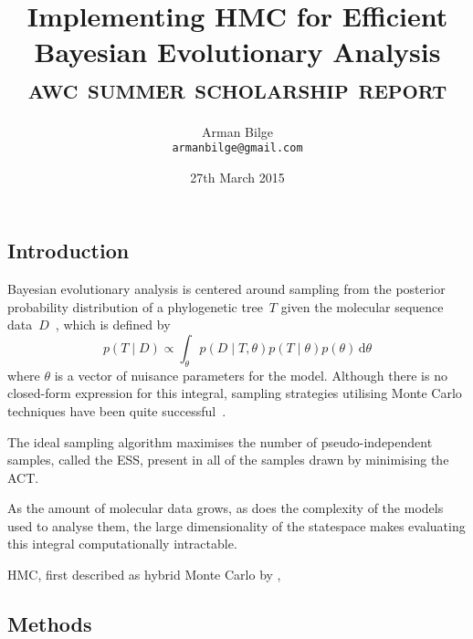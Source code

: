 \documentclass{article}
\title{Implementing \acl{HMC} for Efficient Bayesian Evolutionary Analysis \\
           \Large\textsc{awc summer scholarship report}}
\author{Arman Bilge \\ \texttt{armanbilge@gmail.com}}
\date{27th March 2015}
\newcommand{\dd}{\, \mathrm{d}}
\begin{document}
    \maketitle

    \subsection*{Introduction}

    Bayesian evolutionary analysis is centered around sampling from the
        posterior probability distribution of a phylogenetic tree~$T$ given the
        molecular sequence
        data~$D$~\cite{Bou+14}, which is defined by
        \begin{equation}
            p\left(T \mid D\right)
                \propto \int_\theta p\left(D \mid T,\theta\right)
                p\left(T \mid \theta\right) p\left(\theta\right) \dd\theta
        \end{equation}
        where $\theta$ is a vector of nuisance parameters for the model.
    Although there is no closed-form expression for this integral, sampling
        strategies utilising Monte Carlo techniques have been quite
        successful~\cite{RH03,Dru+12,Bou+14}.

    The ideal sampling algorithm maximises the number of pseudo-independent
        samples, called the \ac{ESS}, present in all of the samples drawn by
        minimising the \ac{ACT}.

    As the amount of molecular data grows, as does the complexity of the models
        used to analyse them, the large dimensionality of the statespace makes
        evaluating this integral computationally intractable.

    \ac{HMC}, first described as hybrid Monte Carlo by \textcite{Dua+87},

    \subsection*{Methods}
\end{document}
